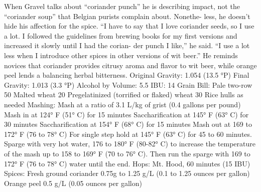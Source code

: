 \documentclass[a4paper,parskip=half]{scrartcl}
\begin{document}
\parencite[73]{Hieronymus2010}

When Gravel talks about “coriander punch” he is describing impact,
not the “coriander soup” that Belgian purists complain about. Nonethe-
less, he doesn’t hide his affection for the spice. “I have to say that I love
coriander seeds, so I use a lot. I followed the guidelines from brewing
books for my first versions and increased it slowly until I had the corian-
der punch I like,” he said. “I use a lot less when I introduce other spices
in other versions of wit beer.”
He reminds novices that coriander provides citrusy aroma and flavor
to wit beer, while orange peel lends a balancing herbal bitterness.
Original Gravity: 1.054 (13.5 °P)
Final Gravity: 1.013 (3.3 °P)
Alcohol by Volume: 5.5%
IBU: 14
Grain Bill:
Pale two-row 50%
Malted wheat 20%
Pregelatinized (torrified or flaked) wheat 30%
Rice hulls as needed
Mashing:
Mash at a ratio of 3.1 L/kg of grist (0.4 gallons per pound)
Mash in at 124° F (51° C) for 15 minutes
Saccharification at 145° F (63° C) for 30 minutes
Saccharification at 154° F (68° C) for 15 minutes
Mash out at 169 to 172° F (76 to 78° C)
For single step hold at 145° F (63° C) for 45 to 60 minutes. Sparge with very
hot water, 176 to 180° F (80-82° C) to increase the temperature of the mash
up to 158 to 169° F (70 to 76° C). Then run the sparge with 169 to 172° F (76
to 78° C) water until the end.
Hops: Mt. Hood, 60 minutes (15 IBU)
Spices: Fresh ground coriander 0.75g to 1.25 g/L
(0.1 to 1.25 ounces per gallon)
Orange peel 0.5 g/L (0.05 ounces per gallon)

\parencite[74]{Hieronymus2010}
\end{document}
